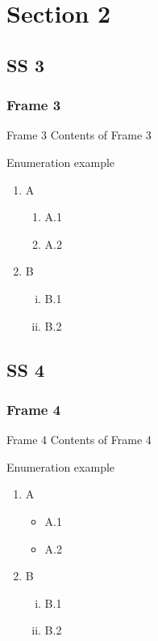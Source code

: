 \documentclass[12pt]{beamer}
\begin{document}
\section{Section 2}
\subsection{SS 3}
\begin{frame}[shrink]
\frametitle{Frame 3}
\begin{block}{Frame 3}
\pause
Contents of Frame 3

Enumeration example
\begin{enumerate}[I]
\item{A}
\begin{enumerate}[i]
\item{A.1}
\item{A.2}
\end{enumerate}
\item{B}
\begin{enumerate}[(i)]
\item{B.1}
\item{B.2}
\end{enumerate}
\end{enumerate}

\end{block}
\end{frame}

\subsection{SS 4}
\begin{frame}[shrink]
\frametitle{Frame 4}
\begin{block}{Frame 4}
\pause
Contents of Frame 4

Enumeration example
\begin{enumerate}[I]
\item{A}
\begin{itemize}
\item{A.1}
\item{A.2}
\end{itemize}
\item{B}
\begin{enumerate}[(i)]
\item{B.1}
\item{B.2}
\end{enumerate}
\end{enumerate}

\end{block}
\end{frame}
\end{document}
